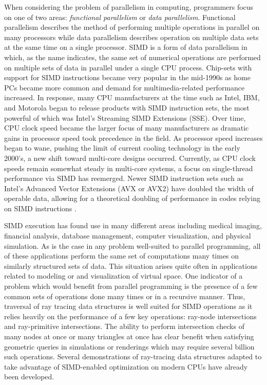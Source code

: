 When considering the problem of parallelism in computing, programmers focus on
one of two areas: \textit{functional parallelism} or \textit{data
  parallelism}. Functional parallelism describes the method of performing
multiple operations in parallel on many processors while data parallelism
describes operation on multiple data sets at the same time on a single
processor. SIMD is a form of data parallelism in which, as the name indicates,
the same set of numerical operations are performed on multiple sets of data in
parallel under a single CPU process. Chip-sets with support for SIMD
instructions became very popular in the mid-1990s as home PCs became more common
and demand for multimedia-related performance increased. In response, many CPU
manufacturers at the time such as Intel, IBM, and Motorola began to release
products with SIMD instruction sets, the most powerful of which was Intel's
Streaming SIMD Extensions (SSE). Over time, CPU clock speed became the larger
focus of many manufacturers as dramatic gains in processor speed took precedence
in the field. As processor speed increases began to wane, pushing the limit of
current cooling technology in the early 2000's, a new shift toward multi-core
designs occurred. Currently, as CPU clock speeds remain somewhat steady in
multi-core systems, a focus on single-thread performance via SIMD has
reemerged. Newer SIMD instruction sets such as Intel's Advanced Vector
Extensions (AVX or AVX2) have doubled the width of operable data, allowing for a
theoretical doubling of performance in codes relying on SIMD instructions
\cite{Hughes_2015}.

SIMD execution has found use in many different areas including medical imaging,
financial analysis, database management, computer visualization, and physical
simulation. As is the case in any problem well-suited to parallel programming,
all of these applications perform the same set of computations many times on
similarly structured sets of data. This situation arises quite often in
applications related to modeling or and visualization of virtual space. One
indicator of a problem which would benefit from parallel programming is the
presence of a few common sets of operations done many times or in a recursive
manner. Thus, traversal of ray tracing data structures is well suited for SIMD
operations as it relies heavily on the performance of a few key operations:
ray-node intersections and ray-primitive intersections. The ability to perform
intersection checks of many nodes at once or many triangles at once has clear
benefit when satisfying geometric queries in simulations or renderings which may
require several billion such operations. Several demonstrations of ray-tracing data
structures adapted to take advantage of SIMD-enabled optimization on modern CPUs
have already been developed.

